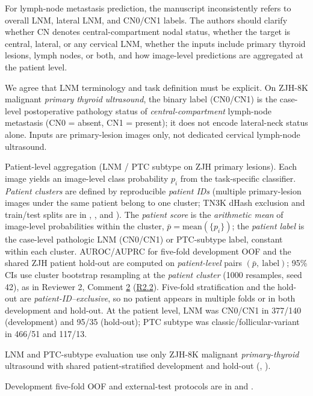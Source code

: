 \label{rev:R2.12}
\begin{reviewercomment}
For lymph-node metastasis prediction, the manuscript inconsistently refers to overall LNM, lateral LNM, and CN0/CN1 labels. The authors should clarify whether CN denotes central-compartment nodal status, whether the target is central, lateral, or any cervical LNM, whether the inputs include primary thyroid lesions, lymph nodes, or both, and how image-level predictions are aggregated at the patient level.
\end{reviewercomment}
\begin{authorresponse}
We agree that LNM terminology and task definition must be explicit. On ZJH-8K malignant \emph{primary thyroid ultrasound}, the binary label (CN0/CN1) is the case-level postoperative pathology status of \emph{central-compartment} lymph-node metastasis (CN0 = absent, CN1 = present); it does not encode lateral-neck status alone. Inputs are primary-lesion images only, not dedicated cervical lymph-node ultrasound.\par
Patient-level aggregation (LNM / PTC subtype on ZJH primary lesions). Each image yields an image-level class probability $p_i$ from the task-specific classifier. \emph{Patient clusters} are defined by reproducible \emph{patient IDs} (multiple primary-lesion images under the same patient belong to one cluster; TN3K dHash exclusion and train/test splits are in , , and ). The \emph{patient score} is the \emph{arithmetic mean} of image-level probabilities within the cluster, $\bar p=\mathrm{mean}(\{p_i\})$; the \emph{patient label} is the case-level pathologic LNM (CN0/CN1) or PTC-subtype label, constant within each cluster. AUROC/AUPRC for five-fold development OOF and the shared ZJH patient hold-out are computed on \emph{patient-level} pairs $(\bar p,\ \mathrm{label})$; 95\% CIs use cluster bootstrap resampling at the \emph{patient cluster} (1000 resamples, seed 42), as in Reviewer 2, Comment \hyperref[rev:R2.2]{2} (\hyperref[rev:R2.2]{R2.2}). Five-fold stratification and the hold-out are \emph{patient-ID--exclusive}, so no patient appears in multiple folds or in both development and hold-out. At the patient level, LNM was CN0/CN1 in 377/140 (development) and 95/35 (hold-out); PTC subtype was classic/follicular-variant in 466/51 and 117/13.\par
LNM and PTC-subtype evaluation use only ZJH-8K malignant \emph{primary-thyroid} ultrasound with shared patient-stratified development and hold-out (, ).\par
Development five-fold OOF and external-test protocols are in  and .\par
\par
\end{authorresponse}


